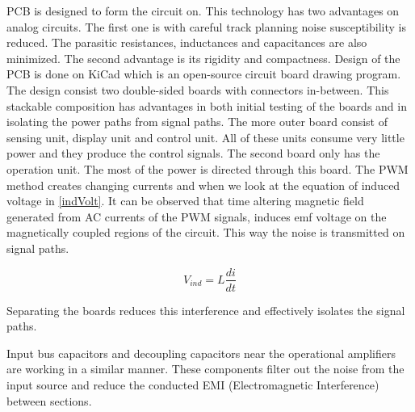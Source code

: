 \documentclass[conference]{IEEEtran}
\begin{document}
PCB is designed to form the circuit on. This technology has two advantages on analog circuits. The first one is with careful track planning noise susceptibility is reduced. The parasitic resistances, inductances and capacitances are also minimized. The second advantage is its rigidity and compactness. Design of the PCB is done on KiCad which is an open-source circuit board drawing program. The design consist two double-sided boards with connectors in-between. This stackable composition has advantages in both initial testing of the boards and in isolating the power paths from signal paths. The more outer board consist of sensing unit, display unit and control unit. All of these units consume very little power and they produce the control signals. The second board only has the operation unit. The most of the power is directed through this board. The PWM method creates changing currents and when we look at the equation of induced voltage in \eqref{indVolt}. It can be observed that time altering magnetic field generated from AC currents of the PWM signals, induces emf voltage on the magnetically coupled regions of the circuit. This way the noise is transmitted on signal paths. 

\begin{equation}
V_{ind} = L\frac{di}{dt} \label{indVolt}    
\end{equation}

Separating the boards reduces this interference and effectively isolates the signal paths. 

Input bus capacitors and decoupling capacitors near the operational amplifiers are working in a similar manner. These components filter out the noise from the input source and reduce the conducted EMI (Electromagnetic Interference) between sections.
\end{document}
